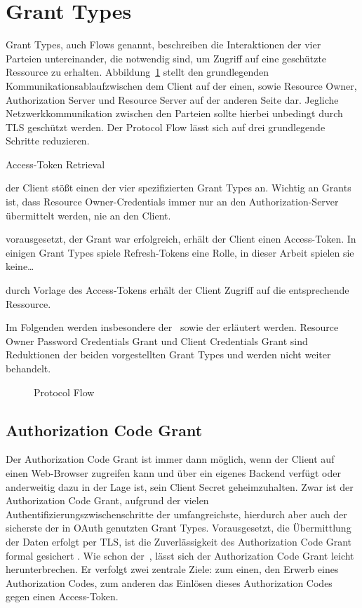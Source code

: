 \section{\glspl{Grant Type}}\label{GrantTypes} \glspl{Grant Type}, auch Flows
genannt, beschreiben die Interaktionen der vier Parteien untereinander, die
notwendig sind, um Zugriff auf eine geschützte Ressource zu erhalten.
Abbildung~\ref{fig: Protocol Flow} stellt den grundlegenden
Kommunikationsablaufzwischen dem Client auf der einen, sowie Resource Owner,
Authorization Server und Resource Server auf der anderen Seite dar. Jegliche
Netzwerkkommunikation zwischen den Parteien sollte hierbei unbedingt durch TLS
geschützt werden. Der Protocol Flow lässt sich
auf drei grundlegende Schritte reduzieren.

\begin{labeling}{Access-Token Retrieval}
    \item [Authorization Grant] der Client stößt einen der vier spezifizierten
    \glspl{Grant Type} an. Wichtig an Grants ist, dass Resource
    Owner-Credentials immer nur an den Authorization-Server übermittelt werden,
    nie an den Client.
    \item [Access-Token Retrieval] vorausgesetzt, der Grant war erfolgreich,
    erhält der Client einen Access-Token. In einigen Grant Types spiele
    Refresh-Tokens eine Rolle, in dieser Arbeit spielen sie keine\ldots
    \item [Resource Access] durch Vorlage des Access-Tokens erhält der Client
    Zugriff auf die entsprechende Ressource.
\end{labeling} Im Folgenden werden insbesondere der~
sowie der  erläutert werden. Resource Owner Password
Credentials Grant und Client Credentials Grant sind Reduktionen der beiden
vorgestellten \glspl{Grant Type} und werden nicht weiter behandelt.

\begin{figure}[h]
    \scalebox{.5} {
        
    }
    \caption{Protocol Flow}\label{fig: Protocol Flow}
\end{figure} \noindent
\subsection{Authorization Code Grant}\label{ssec:authcode} Der Authorization
Code Grant ist immer dann möglich, wenn der Client auf einen Web-Browser
zugreifen kann und über ein eigenes Backend verfügt oder anderweitig dazu in der
Lage ist, sein Client Secret  geheimzuhalten. Zwar ist der Authorization Code
Grant, aufgrund der vielen Authentifizierungszwischenschritte der
umfangreichste, hierdurch aber auch der sicherste der in \gls{OAuth} genutzten
\glspl{Grant Type}. Vorausgesetzt, die Übermittlung der Daten erfolgt per
\gls{TLS}, ist die Zuverlässigkeit des Authorization Code Grant formal gesichert
\cite{Chari.2011}. Wie schon der~, lässt sich der
Authorization Code Grant leicht herunterbrechen. Er verfolgt zwei zentrale
Ziele: zum einen, den Erwerb eines Authorization Codes, zum anderen das Einlösen
dieses Authorization Codes gegen einen Access-Token.

